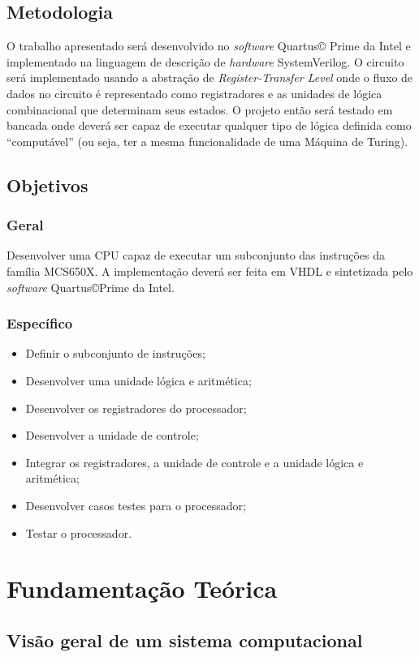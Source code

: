\documentclass[
	12pt,				  %
	openright,		%
	a4paper,			%
	english,			%
	french,				%
	spanish,			%
	brazil,				%
]{abntex2}
\begin{document}
\section{Metodologia}
O trabalho apresentado será desenvolvido no \emph{software} Quartus\copyright
Prime da Intel e implementado na linguagem de descrição de \emph{hardware}
SystemVerilog. O circuito será implementado usando a abstração de
\emph{Register-Transfer Level} onde o fluxo de dados no circuito é representado
como registradores e as unidades de lógica combinacional que determinam seus
estados. O projeto então será testado em bancada onde deverá ser capaz de
executar qualquer tipo de lógica definida como ``computável'' (ou seja, ter a
mesma funcionalidade de uma Máquina de Turing).


\section{Objetivos}
\subsection*{Geral}
Desenvolver uma CPU capaz de executar um subconjunto das instruções da família
MCS650X. A implementação deverá ser feita em VHDL e sintetizada pelo
\emph{software} Quartus\copyright Prime da Intel.
\subsection*{Específico}
\begin{itemize}
	\item Definir o subconjunto de instruções;
	\item Desenvolver uma unidade lógica e aritmética;
	\item Desenvolver os registradores do processador;
	\item Desenvolver a unidade de controle;
	\item Integrar os registradores, a unidade de controle e a unidade lógica e
	      aritmética;
	\item Desenvolver casos testes para o processador;
	\item Testar o processador.
\end{itemize}

\chapter{Fundamentação Teórica}

\section{Visão geral de um sistema computacional}
\end{document}
